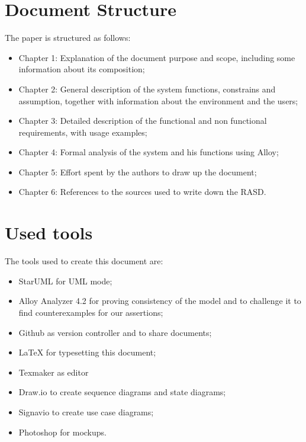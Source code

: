 \section{Document Structure}
The paper is structured as follows:
\begin{itemize}
\item Chapter 1: Explanation of the document purpose and scope, including some information about its composition;
\item Chapter 2: General description of the system functions, constrains and assumption, together with information about the environment and the users;
\item Chapter 3: Detailed description of the functional and non functional requirements, with usage examples;
\item Chapter 4: Formal analysis of the system and his functions using Alloy;
\item Chapter 5: Effort spent by the authors to draw up the document;
\item Chapter 6: References to the sources used to write down the RASD.
\end{itemize}
%
%
\section{Used tools}
The tools used to create this document are:
\begin{itemize}
\item StarUML for UML mode;
\item Alloy Analyzer 4.2 for proving consistency of the model and to challenge it to find counterexamples for our assertions;
\item Github as version controller and to share documents;
\item LaTeX for typesetting this document;
\item Texmaker as editor
\item Draw.io to create sequence diagrams and state diagrams;
\item Signavio to create use case diagrams;
\item Photoshop for mockups.
\end{itemize}
%
